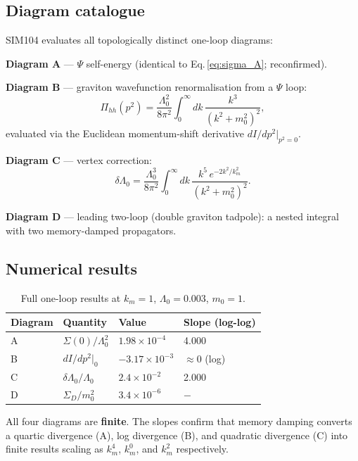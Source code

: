 \documentclass[12pt,a4paper]{article}
\begin{document}
\subsection{Diagram catalogue}

SIM104 evaluates all topologically distinct one-loop diagrams:

\medskip
\noindent\textbf{Diagram A} — $\Psi$ self-energy (identical to
Eq.\,\ref{eq:sigma_A}; reconfirmed).

\medskip
\noindent\textbf{Diagram B} — graviton wavefunction renormalisation from
a $\Psi$ loop:
\begin{equation}
\Pi_{hh}(p^2) = \frac{\Lambda_0^2}{8\pi^2}
\int_0^\infty dk\,\frac{k^3}{(k^2+m_0^2)^2},
\end{equation}
evaluated via the Euclidean momentum-shift derivative
$dI/dp^2|_{p^2=0}$.

\medskip
\noindent\textbf{Diagram C} — vertex correction:
\begin{equation}
\delta\Lambda_0 = \frac{\Lambda_0^3}{8\pi^2}
\int_0^\infty dk\,\frac{k^5\,e^{-2k^2/k_m^2}}{(k^2+m_0^2)^2}.
\label{eq:delta_L}
\end{equation}

\medskip
\noindent\textbf{Diagram D} — leading two-loop (double graviton tadpole):
a nested integral with two memory-damped propagators.

\subsection{Numerical results}

\begin{table}[H]
\centering
\caption{Full one-loop results at $k_m=1$, $\Lambda_0=0.003$, $m_0=1$.}
\begin{tabular}{llll}
\toprule
Diagram & Quantity & Value & Slope (log-log) \\
\midrule
A & $\Sigma(0)/\Lambda_0^2$ & $1.98\times10^{-4}$ & 4.000 \\
B & $dI/dp^2|_0$ & $-3.17\times10^{-3}$ & $\approx0$ (log) \\
C & $\delta\Lambda_0/\Lambda_0$ & $2.4\times10^{-2}$ & 2.000 \\
D & $\Sigma_D/m_0^2$ & $3.4\times10^{-6}$ & $-$ \\
\bottomrule
\end{tabular}
\label{tab:one_loop}
\end{table}

All four diagrams are \textbf{finite}.  The slopes confirm that memory
damping converts a quartic divergence (A), log divergence (B), and
quadratic divergence (C) into finite results scaling as
$k_m^4$, $k_m^0$, and $k_m^2$ respectively.
\end{document}
